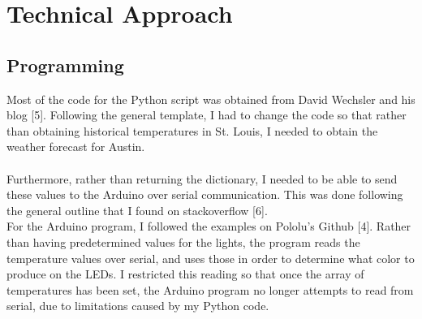 \documentclass[12pt]{article}
\begin{document}
\section{Technical Approach}

\subsection{Programming}
Most of the code for the Python script was obtained from David Wechsler and his blog [5]. Following the general template, I had to change the code so that rather than obtaining historical temperatures in St. Louis, I needed to obtain the weather forecast for Austin. \\\\ Furthermore, rather than returning the dictionary, I needed to be able to send these values to the Arduino over serial communication. This was done following the general outline that I found on stackoverflow [6].\\
\indent For the Arduino program, I followed the examples on Pololu's Github [4]. Rather than having predetermined values for the lights, the program reads the temperature values over serial, and uses those in order to determine what color to produce on the LEDs. I restricted this reading so that once the array of temperatures has been set, the Arduino program no longer attempts to read from serial, due to limitations caused by my Python code.
\end{document}
